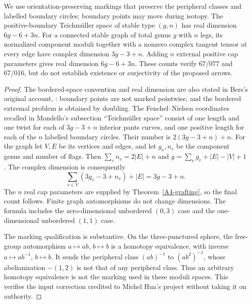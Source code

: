 \begin{proposition}
\label{A1-dimensions}
We use orientation-preserving markings that preserve the peripheral
classes and labelled boundary circles; boundary points may move during
isotopy. The positive-boundary Teichm\"uller space of stable type $(g,n)$
has real dimension $6g-6+3n$. For a connected stable graph of total genus
$g$ with $n$ legs, its normalized component moduli together with a
nonzero complex tangent tensor at every edge have complex dimension
$3g-3+n$. Adding $n$ external positive cap parameters gives real
dimension $6g-6+3n$. These counts verify 67/077 and 67/016, but do not
establish existence or surjectivity of the proposed arrows.
\end{proposition}
\begin{proof}
The bordered-space convention and real dimension are also stated in
Bers's original account, \cite[\S2(F), p.~139; \S3(F), p.~141;
\S4(E), p.~143]{ABers1981}: boundary points are not marked pointwise,
and the bordered extremal problem is obtained by doubling. The
Fenchel--Nielsen coordinates recalled in Mondello's subsection
``Teichm\"uller space'' \cite{AMondello2011} consist of one length and
one twist for each of $3g-3+n$ interior pants curves, and one positive
length for each of the $n$ labelled boundary circles. Their number is
$2(3g-3+n)+n$. For the graph let $V,E$ be its vertices and edges, and
let $g_v,n_v$ be the component genus and number of flags. Then
$\sum_v n_v=2|E|+n$ and
$g=\sum_vg_v+|E|-|V|+1$. The complex dimension is consequently
\[
 \sum_{v\in V}(3g_v-3+n_v)+|E|=3g-3+n.
\]
The $n$ real cap parameters are supplied by
Theorem~\ref{A4-grafting}, so the final count follows. Finite graph
automorphisms do not change dimensions. The formula includes the
zero-dimensional unbordered $(0,3)$ case and the one-dimensional
unbordered $(1,1)$ case.

The marking qualification is substantive. On the three-punctured
sphere, the free-group automorphism $a\mapsto ab$, $b\mapsto b$ is a
homotopy equivalence, with inverse $a\mapsto ab^{-1}$, $b\mapsto b$.
It sends the peripheral class $(ab)^{-1}$ to $(ab^2)^{-1}$, whose
abelianization $-(1,2)$ is not that of any peripheral class. Thus an
arbitrary homotopy equivalence is not the marking used in these moduli
spaces. This verifies the input correction credited to Michel Hua's
project without taking it on authority.
\end{proof}

